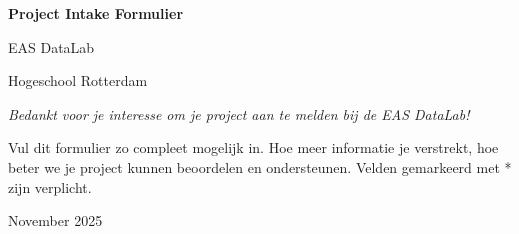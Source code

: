 \documentclass[a4paper,11pt]{article}
\begin{document}
\begin{titlepage}
    \centering
    \vspace*{2cm}
    
    {\Huge\bfseries\color{hrblue} Project Intake Formulier\par}
    \vspace{0.5cm}
    {\Large EAS DataLab\par}
    \vspace{2cm}
    
    {\Large Hogeschool Rotterdam\par}
    \vspace{3cm}
    
    
    {\large\textit{Bedankt voor je interesse om je project aan te melden bij de EAS DataLab!}\par}
    \vspace{1cm}
    
    {\normalsize Vul dit formulier zo compleet mogelijk in. Hoe meer informatie je verstrekt, hoe beter we je project kunnen beoordelen en ondersteunen. Velden gemarkeerd met * zijn verplicht.\par}
    
    \vfill
    
    {\small November 2025\par}
\end{titlepage}
\end{document}
